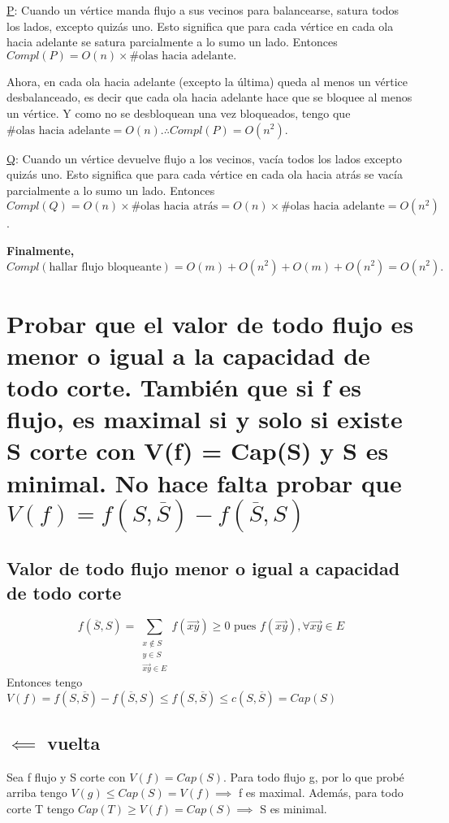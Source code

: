 \documentclass[11pt]{article}
\begin{document}
\uline{P}:
Cuando un vértice manda flujo a sus vecinos para balancearse, satura todos los lados, excepto quizás uno. Esto significa que para cada vértice en cada ola hacia adelante se satura parcialmente a lo sumo un lado. Entonces \(Compl(P) = O(n) \times \# \text{olas hacia adelante}.\)

Ahora, en cada ola hacia adelante (excepto la última) queda al menos un vértice desbalanceado, es decir que cada ola hacia adelante hace que se bloquee al menos un vértice. Y como no se desbloquean una vez bloqueados, tengo que \(\# \text{olas hacia adelante} = O(n). \therefore Compl(P) = O(n^2)\).

\uline{Q}:
Cuando un vértice devuelve flujo a los vecinos, vacía todos los lados excepto quizás uno. Esto significa que para cada vértice en cada ola hacia atrás se vacía parcialmente a lo sumo un lado. Entonces \(Compl(Q) = O(n) \times \# \text{olas hacia atrás} = O(n) \times \# \text{olas hacia adelante} = O(n^2)\).

\textbf{Finalmente,
\[Compl(\text{hallar flujo bloqueante}) = O(m) + O(n^2) + O(m) + O(n^2) = O(n^2).\]}


\section{Probar que el valor de todo flujo es menor o igual a la capacidad de todo corte. También que si f es flujo, es maximal si y solo si existe S corte con V(f) = Cap(S) y S es minimal. No hace falta probar que \(V(f) = f(S, \overline{S}) - f(\overline{S}, S)\)}
\label{sec:orgd08b8d8}
\subsection{Valor de todo flujo menor o igual a capacidad de todo corte}
\label{sec:orgd84daaa}
\[
f(\overline{S}, S) = \sum_{\substack{x \not\in S \\ y \in S \\ \overrightarrow{xy} \in E}} f(\overrightarrow{xy}) \ge 0 \text{ pues } f(\overrightarrow{xy}), \forall \overrightarrow{xy} \in E
\]
Entonces tengo \(V(f) = f(S, \overline{S}) - f(\overline{S}, S) \le f(S, \overline{S}) \le c(S, \overline{S}) = Cap(S)\)

\subsection{\(\impliedby\) vuelta}
\label{sec:org604344b}
Sea f flujo y S corte con \(V(f) = Cap(S)\). Para todo flujo g, por lo que probé arriba tengo \(V(g) \le Cap(S) = V(f) \implies\) f es maximal. Además, para todo corte T tengo \(Cap(T) \ge V(f) = Cap(S) \implies\) S es minimal.
\end{document}
